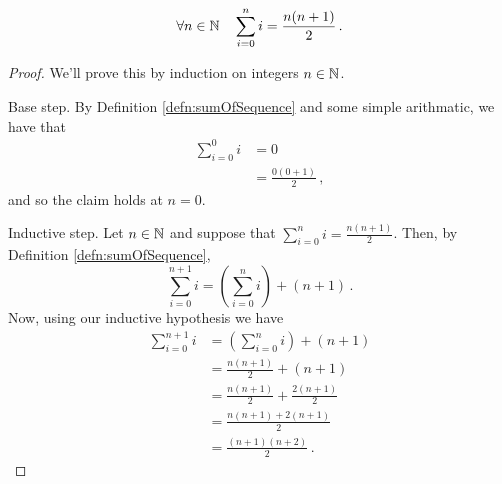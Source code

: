 \guard



\begin{prop}
\label{prop:sumOfConsequtiveIntegers}
  \[\forall n\in\mathbb{N}\quad\sum_{i=0}^n i = \frac{n(n+1)}{2}\,.\]
\end{prop}
\begin{proof}
  We'll prove this by induction on integers $n\in\mathbb{N}$.

  Base step.
  By Definition \ref{defn:sumOfSequence} and some simple arithmatic, we have that
    \begin{align*}
      \sum_{i=0}^0 i  &= 0 \\
                      &= \frac{ 0(0+1)}{2}\,,
    \end{align*}
  and so the claim holds at $n=0$.

  Inductive step. Let $n\in\mathbb{N}$ and suppose that $\sum_{i=0}^n i = \frac{n(n+1)}{2}$.
  Then, by Definition \ref{defn:sumOfSequence},
    \[ \sum_{i=0}^{n+1} i = \left( \sum_{i=0}^{n} i \right) + (n+1)\,. \]
  Now, using our inductive hypothesis we have
    \begin{align*}
      \sum_{i=0}^{n+1} i &= \left( \sum_{i=0}^{n} i \right) + (n+1) \\
                        &= \frac{ n(n+1)}{2} + (n+1) \\
                        &= \frac{ n(n+1)}{2} + \frac{2(n+1)}{2} \\
                        &= \frac{ n(n+1)+2(n+1)}{2} \\
                        &= \frac{ (n+1)(n+2) }{2} \,.
    \end{align*}
\end{proof}
